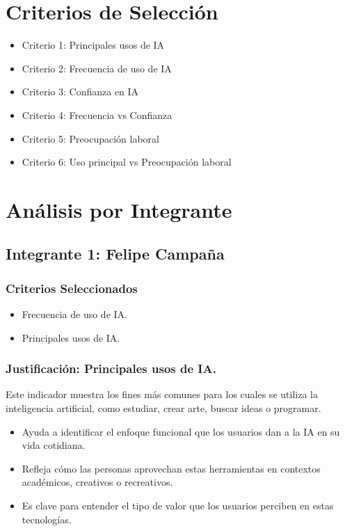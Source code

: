 \documentclass[12pt, a4paper]{article}
\begin{document}
\section*{Criterios de Selección}
\begin{itemize}
    \item Criterio 1: Principales usos de IA
    \item Criterio 2: Frecuencia de uso de IA	
    \item Criterio 3: Confianza en IA
    \item Criterio 4: Frecuencia vs Confianza
    \item Criterio 5: Preocupación laboral
    \item Criterio 6: Uso principal vs Preocupación laboral	
\end{itemize}

\section*{Análisis por Integrante}

\subsection*{Integrante 1: Felipe Campaña}

\subsubsection*{Criterios Seleccionados}
\begin{itemize}
    \item Frecuencia de uso de IA.
    \item Principales usos de IA.
\end{itemize}

\subsubsection*{Justificación: Principales usos de IA.}
Este indicador muestra los fines más comunes para los cuales se utiliza la inteligencia artificial, como estudiar, crear arte, buscar ideas o programar.

\begin{itemize}
    \item Ayuda a identificar el enfoque funcional que los usuarios dan a la IA en su vida cotidiana.
    \item Refleja cómo las personas aprovechan estas herramientas en contextos académicos, creativos o recreativos.
    \item Es clave para entender el tipo de valor que los usuarios perciben en estas tecnologías.
\end{itemize}
\end{document}
